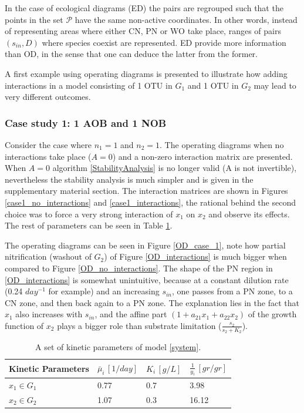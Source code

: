 \documentclass[3p,times]{article}
\begin{document}
In the case of ecological diagrams (ED) the pairs are regrouped such that the points in the set $\mathcal{P}$ have the same non-active coordinates. In other words, instead of representing areas where either CN, PN or WO take place, ranges of pairs $(s_{in},D)$ where species coexist are represented.	ED provide more information than OD, in the sense that one can deduce the latter from the former. 

A first example using operating diagrams is presented to illustrate how adding interactions in a model consisting of 1 OTU in $G_1$ and 1 OTU in $G_2$ may lead to very different outcomes.

\subsubsection{Case study 1: 1 AOB and 1 NOB}

Consider the case where $n_1 = 1$ and $n_2 = 1$. The operating diagrams when no interactions take place ($A = 0$) and a non-zero interaction matrix are presented. When $A=0$ algorithm \ref{StabilityAnalysis} is no longer valid (A is not invertible), nevertheless the stability analysis is much simpler and is given in the supplementary material section. The interaction matrices are shown in Figures \ref{case1_no_interactions} and \ref{case1_interactions}, the rational behind the second choice was to force a very strong interaction of $x_1$ on $x_2$ and observe its effects. The rest of parameters can be seen in Table \ref{kinetic_parameters_case_study_1}.

The operating diagrams can be seen in Figure \ref{OD_case_1}, note how partial nitrification (washout of $G_2$) of Figure \ref{OD_interactions} is much bigger when compared to Figure \ref{OD_no_interactions}. The shape of the PN region in \ref{OD_interactions} is somewhat unintuitive, because at a constant dilution rate (0.24 $day^{-1}$ for example) and an increasing $s_{in}$, one passes from a PN zone, to a CN zone, and then back again to a PN zone. The explanation lies in the fact that $x_1$ also increases with $s_{in}$, and the affine part $(1+ a_{21}x_1 +a_{22}x_2)$ of the growth function of $x_2$ plays a bigger role than substrate limitation ($\frac{s_2}{s_2+K_2}$). 


\begin{table}[ht]
	\centering
	\begin{tabular}{|l|l|l|l|}
		\hline
		Kinetic Parameters & $\bar{\mu}_i\,[1/day]$ & $K_i\,[g/L]$ & $\frac{1}{y_i} \, [gr/gr]$ \\ \hline
		$x_1 \in G_1$ & 0.77  & 0.7 & 3.98  \\ \hline
		$x_2\in G_2$ & 1.07 & 0.3 &  16.12 \\ \hline
	\end{tabular}	
	\caption{A set of kinetic parameters of model \eqref{system}.}
	\label{kinetic_parameters_case_study_1}
\end{table}
\end{document}

